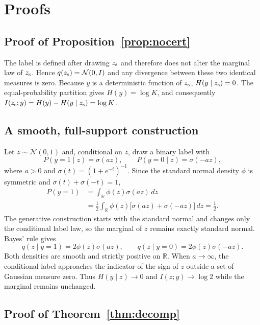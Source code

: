 \section{Proofs}
\label{app:proofs}

\subsection{Proof of Proposition~\ref{prop:nocert}}

The label is defined after drawing $z_{\mathrm{s}}$ and therefore does not alter the
marginal law of $z_{\mathrm{s}}$.  Hence $q(z_{\mathrm{s}})=\mathcal N(0,I)$ and any divergence
between these two identical measures is zero.  Because $y$ is a deterministic
function of $z_{\mathrm{s}}$, $H(y\mid z_{\mathrm{s}})=0$.  The equal-probability partition gives
$H(y)=\log K$, and consequently
$I(z_{\mathrm{s}};y)=H(y)-H(y\mid z_{\mathrm{s}})=\log K$.

\subsection{A smooth, full-support construction}

Let $z\sim\mathcal N(0,1)$ and, conditional on $z$, draw a binary label with
\begin{equation}
P(y=1\mid z)=\sigma(az),\qquad P(y=0\mid z)=\sigma(-az),
\end{equation}
where $a>0$ and $\sigma(t)=(1+e^{-t})^{-1}$.  Since the standard normal
density $\phi$ is symmetric and $\sigma(t)+\sigma(-t)=1$,
\begin{align}
P(y=1)
&=\int_{\mathbb R}\phi(z)\sigma(az)\,dz\\
&=\frac12\int_{\mathbb R}\phi(z)
\bigl[\sigma(az)+\sigma(-az)\bigr]\,dz=\frac12.
\end{align}
The generative construction starts with the standard normal and changes only
the conditional label law, so the marginal of $z$ remains exactly standard
normal.  Bayes' rule gives
\begin{equation}
q(z\mid y=1)=2\phi(z)\sigma(az),\qquad
q(z\mid y=0)=2\phi(z)\sigma(-az).
\end{equation}
Both densities are smooth and strictly positive on $\mathbb R$.  When
$a\rightarrow\infty$, the conditional label approaches the indicator of the
sign of $z$ outside a set of Gaussian measure zero.  Thus
$H(y\mid z)\rightarrow0$ and $I(z;y)\rightarrow\log2$ while the marginal
remains unchanged.

\subsection{Proof of Theorem~\ref{thm:decomp}}

